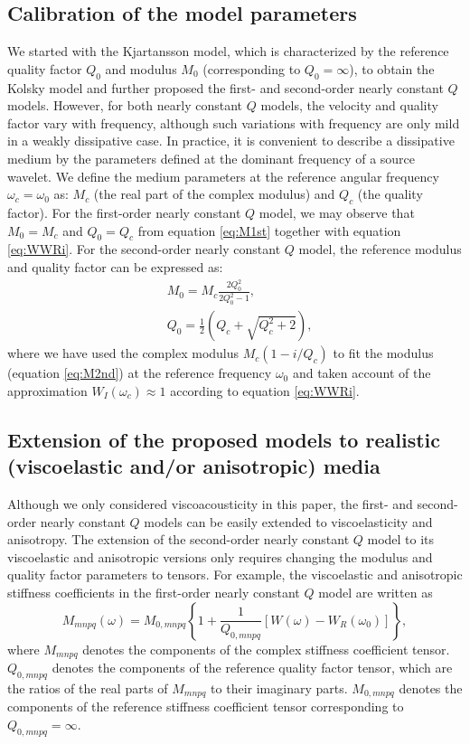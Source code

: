 \documentclass[article]{./macros/elsarticle_qh}
\begin{document}
\subsection{Calibration of the model parameters}
We started with the Kjartansson model, which is characterized by the reference quality factor $Q_{0}$ and modulus $M_{0}$ (corresponding to $Q_{0}=\infty$), to obtain the Kolsky model and further proposed the first- and second-order nearly constant $Q$ models. However, for both nearly constant $Q$ models, the velocity and quality factor vary with frequency, although such variations with frequency are only mild in a weakly dissipative case. 
In practice, it is convenient to describe a dissipative medium by the parameters defined at the dominant frequency of a source wavelet. We define the medium parameters at the reference angular frequency $\omega_{c}=\omega_{0}$ as: $M_{c}$ (the real part of the complex  modulus) and $Q_{c}$ (the quality factor). 
For the first-order nearly constant $Q$ model, we may observe that $M_{0} = M_{c}$ and $Q_{0} = Q_{c}$ from equation \ref{eq:M1st} together with equation \ref{eq:WWRi}. For the second-order nearly constant $Q$ model, the reference modulus and quality factor can be expressed as:
\begin{align} 
\label{eq:M0}
& M_{0} = M_{c} \frac{2Q_{0}^2}{2Q_{0}^2 - 1} ,  \\
\label{eq:Q0}
& Q_{0} = \frac{1}{2}\left( Q_{c} + \sqrt{Q_{c}^2 + 2} \right) ,
\end{align}
where we have used the complex modulus $M_{c}(1 - i/Q_{c})$ to fit the modulus (equation \ref{eq:M2nd}) at the reference frequency $\omega_{0}$ and taken account of the approximation $W_{I}(\omega_{c}) \approx 1$ according to equation \ref{eq:WWRi}. 

\subsection{Extension of the proposed models to realistic (viscoelastic and/or anisotropic) media}
Although we only considered viscoacousticity in this paper, the first- and second-order nearly constant $Q$ models can be easily extended to viscoelasticity and anisotropy. The extension of the second-order nearly constant $Q$ model to its viscoelastic and anisotropic versions only requires changing the modulus and quality factor parameters to tensors. For example, the viscoelastic and anisotropic stiffness coefficients in the first-order nearly constant $Q$ model are written as  
\begin{equation} \label{eq:M2ndani}
M_{mnpq}(\omega) = M_{0,mnpq}\left \{
1 + \frac{1}{Q_{0,mnpq}} \left[W(\omega) - W_{R}(\omega_{0}) \right] 
\right \} ,
\end{equation} 
where $M_{mnpq}$ denotes the components of the complex stiffness coefficient tensor. $Q_{0,mnpq}$ denotes the components of the reference quality factor tensor, which are the ratios of the real parts of $M_{mnpq}$ to their imaginary parts. $M_{0,mnpq}$ denotes the components of the reference stiffness coefficient tensor corresponding to $Q_{0,mnpq}=\infty$. 
\end{document}
